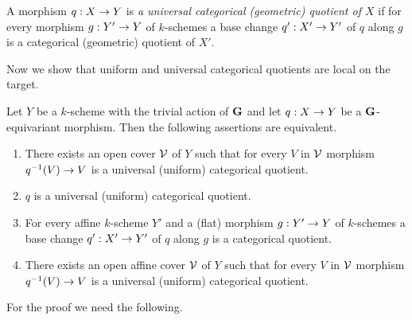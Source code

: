 \begin{definition}
A morphism $q:X\rightarrow Y$ is \textit{a universal categorical (geometric) quotient of $X$} if for every morphism $g:Y'\rightarrow Y$ of $k$-schemes a base change $q':X'\rightarrow Y'$ of $q$ along $g$ is a categorical (geometric) quotient of $X'$. 
\end{definition}
\noindent
Now we show that uniform and universal categorical quotients are local on the target.

\begin{theorem}\label{theorem:uniform_and_universal_categorical_quotients_are_local_and_affine_base_change_suffices}
Let $Y$ be a $k$-scheme with the trivial action of $\mathbf{G}$ and let $q:X\rightarrow Y$ be a $\mathbf{G}$-equivariant morphism. Then the following assertions are equivalent.
\begin{enumerate}[label=\emph{\textbf{(\roman*)}}, leftmargin=3.0em]
\item There exists an open cover ${\mathcal V}$ of $Y$ such that for every $V$ in ${\mathcal V}$ morphism $q^{-1}(V)\rightarrow V$ is a universal (uniform) categorical quotient.
\item $q$ is a universal (uniform) categorical quotient.
\item For every affine $k$-scheme $Y'$ and a (flat) morphism $g:Y'\rightarrow Y$ of $k$-schemes a base change $q':X'\rightarrow Y'$ of $q$ along $g$ is a categorical quotient.
\item There exists an open affine cover ${\mathcal V}$ of $Y$ such that for every $V$ in ${\mathcal V}$ morphism $q^{-1}(V)\rightarrow V$ is a universal (uniform) categorical quotient.
\end{enumerate}
\end{theorem}
\noindent
For the proof we need the following.

